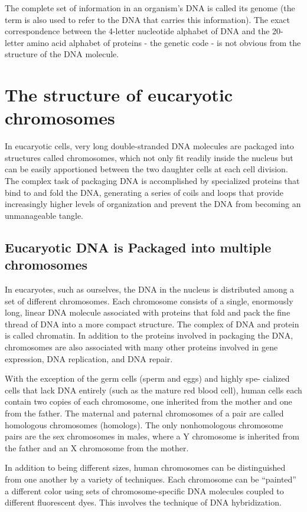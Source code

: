 The complete set of information in an organism’s DNA is called its genome
(the term is also used to refer to the DNA that carries this information).
The exact correspondence between the 4-letter nucleotide alphabet
of DNA and the 20-letter amino acid alphabet of proteins - the genetic
code - is not obvious from the structure of the DNA molecule.

\section{The structure of eucaryotic chromosomes}

In eucaryotic cells, very long double-stranded DNA molecules are packaged
into structures called chromosomes, which not only fit readily inside the
nucleus but can be easily apportioned between the two daughter cells at
each cell division. The complex task of packaging DNA is accomplished
by specialized proteins that bind to and fold the DNA, generating a series
of coils and loops that provide increasingly higher levels of organization
and prevent the DNA from becoming an unmanageable tangle.

\subsection{Eucaryotic DNA is Packaged into multiple chromosomes}

In eucaryotes, such as ourselves, the DNA in the nucleus is distributed
among a set of different chromosomes.
Each chromosome consists of a single, enormously long,
linear DNA molecule associated with proteins that fold and pack the fine
thread of DNA into a more compact structure. The complex of DNA and
protein is called chromatin. In addition to the proteins involved in packaging
the DNA, chromosomes are also associated with many other proteins
involved in gene expression, DNA replication, and DNA repair.

With the exception of the germ cells (sperm and eggs) and highly spe-
cialized cells that lack DNA entirely (such as the mature red blood cell),
human cells each contain two copies of each chromosome, one inherited
from the mother and one from the father. The maternal and paternal
chromosomes of a pair are called homologous chromosomes (homologs).
The only nonhomologous chromosome pairs are the sex chromosomes
in males, where a Y chromosome is inherited from the father and an X
chromosome from the mother.

In addition to being different sizes, human chromosomes can be distinguished
from one another by a variety of techniques. Each chromosome
can be “painted” a different color using sets of chromosome-specific
DNA molecules coupled to different fluorescent dyes. This
involves the technique of DNA hybridization.

